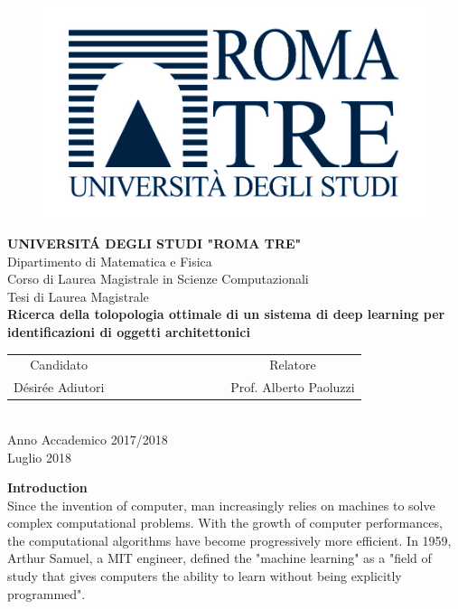 \documentclass[a4paper,12pt]{report}
\begin{document}
\begin{figure}
\centering
\includegraphics[scale=0.28]{Logo.jpg}
\end{figure}
\begin{center}
\textbf{UNIVERSIT\'{A} DEGLI STUDI "ROMA TRE"}\\
\vspace{0.2cm}
\textmd{\large Dipartimento di Matematica e Fisica}\\
\vspace{0.2cm}
\large{ Corso di Laurea Magistrale in Scienze Computazionali}\\	
\vspace{1.3cm}	
\textmd{\Large{Tesi di Laurea Magistrale}}\\
\vspace{1.3cm}
\LARGE{\LARGE{\textbf{Ricerca della tolopologia ottimale di un sistema di deep learning per identificazioni di oggetti architettonici}}}\\
\vspace{4.9cm}
\begin{tabular}{ccccccccccc}
	\large{Candidato}& & & & & & & & & & \large{Relatore}\\
	\large{D\'{e}sir\'{e}e Adiutori} & & & & & & & & & &\large{Prof. Alberto Paoluzzi}
\end{tabular}\\
\vspace{3.3cm}
\normalsize{Anno Accademico 2017/2018}\\
\normalsize{Luglio 2018}
\end{center}
\newpage
\textbf{Introduction}\\
Since the invention of computer, man increasingly relies on machines to solve complex computational problems. With the growth of computer performances, the computational algorithms have become progressively more efficient. In 1959, Arthur Samuel, a MIT engineer, defined the "machine learning" as a "field of study that gives computers the ability to learn without being explicitly programmed".\\
\end{document}
